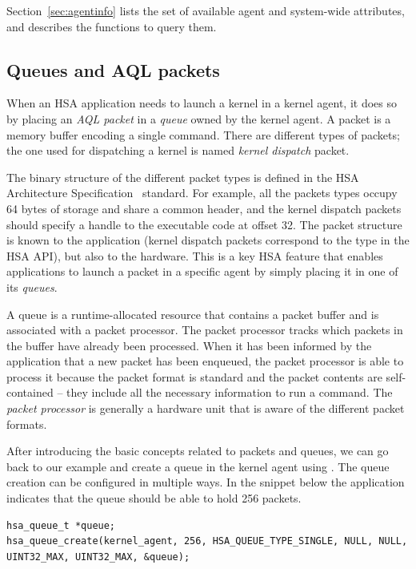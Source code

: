 \documentclass[final,oneside]{book}
\begin{document}

Section~\ref{sec:agentinfo} lists the set of available agent and
system-wide attributes, and describes the functions to query them.

\subsection{Queues and AQL packets}
When an HSA application needs to launch a kernel in a kernel agent, it does so
by placing an \textit{AQL packet} in a \textit{queue} owned by the kernel
agent. A packet is a memory buffer encoding a single command. There are
different types of packets; the one used for dispatching a kernel is named
\emph{kernel dispatch} packet.

The binary structure of the different packet types is defined in the HSA
Architecture Specification~\cite{sar} standard. For example, all the packets
types occupy 64 bytes of storage and share a common header, and the kernel
dispatch packets should specify a handle to the executable code at offset
32. The packet structure is known to the application (kernel dispatch packets
correspond to the  type in the HSA API),
but also to the hardware. This is a key HSA feature that enables applications to
launch a packet in a specific agent by simply placing it in one of its
\textit{queues}.

A queue is a runtime-allocated resource that contains a packet buffer and is
associated with a packet processor. The packet processor tracks which packets in
the buffer have already been processed. When it has been informed by the
application that a new packet has been enqueued, the packet processor is able to
process it because the packet format is standard and the packet contents are
self-contained -- they include all the necessary information to run a
command. The \textit{packet processor} is generally a hardware unit that is
aware of the different packet formats.

After introducing the basic concepts related to packets and queues, we can go
back to our example and create a queue in the kernel agent using
. The queue creation can be configured in multiple
ways. In the snippet below the application indicates that the queue should
be able to hold 256 packets.
\begin{lstlisting}
hsa_queue_t *queue;
hsa_queue_create(kernel_agent, 256, HSA_QUEUE_TYPE_SINGLE, NULL, NULL, UINT32_MAX, UINT32_MAX, &queue);
\end{lstlisting}
\end{document}
